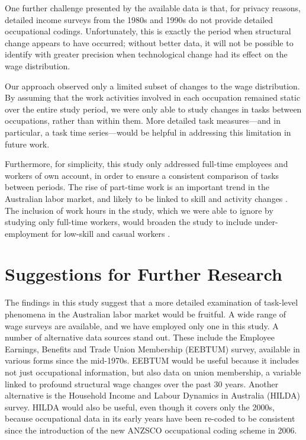 One further challenge presented by the available data is that, for privacy reasons, detailed income surveys from the 1980s and 1990s do not provide detailed occupational codings. Unfortunately, this is exactly the period when structural change appears to have occurred; without better data, it will not be possible to identify with greater precision when technological change had its effect on the wage distribution.

Our approach observed only a limited subset of changes to the wage distribution. By assuming that the work activities involved in each occupation remained static over the entire study period, we were only able to study changes in tasks between occupations, rather than within them. More detailed task measures---and in particular, a task time series---would be helpful in addressing this limitation in future work.

Furthermore, for simplicity, this study only addressed full-time employees and workers of own account, in order to ensure a consistent comparison of tasks between periods. The rise of part-time work is an important trend in the Australian labor market, and likely to be linked to skill and activity changes \citep[see][]{Esposto2012}. The inclusion of work hours in the study, which we were able to ignore by studying only full-time workers, would broaden the study to include under-employment for low-skill and casual workers \citep{Briggs2006}.

\section{Suggestions for Further Research}

The findings in this study suggest that a more detailed examination of task-level phenomena in the Australian labor market would be fruitful. A wide range of wage surveys are available, and we have employed only one in this study. A number of alternative data sources stand out. These include the Employee Earnings, Benefits and Trade Union Membership (EEBTUM) survey, available in various forms since the mid-1970s. EEBTUM would be useful because it includes not just occupational information, but also data on union membership, a variable linked to profound structural wage changes over the past 30 years. Another alternative is the Household Income and Labour Dynamics in Australia (HILDA) survey. HILDA would also be useful, even though it covers only the 2000s, because occupational data in its early years have been re-coded to be consistent since the introduction of the new ANZSCO occupational coding scheme in 2006.

